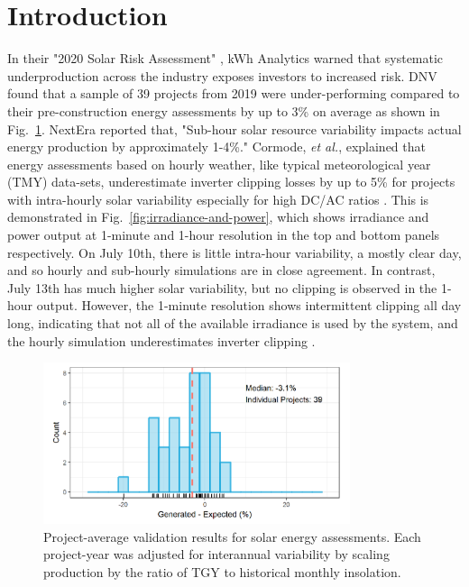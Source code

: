 \documentclass[conference]{IEEEtran}
\begin{document}
\section{Introduction}
In their "2020 Solar Risk Assessment" \cite{Matsui2020}, kWh Analytics warned that systematic underproduction across the industry exposes investors to increased risk. DNV found that a sample of 39 projects from 2019 were under-performing compared to their pre-construction energy assessments by up to 3\% on average as shown in Fig.~\ref{fig:project-underperformance}. NextEra reported that, "Sub-hour solar resource variability impacts actual energy production by approximately 1-4\%." Cormode, \textit{et al.}, explained that energy assessments based on hourly weather, like typical meteorological year (TMY) data-sets, underestimate inverter clipping losses by up to 5\% for projects with intra-hourly solar variability especially for high DC/AC ratios \cite{Cormode2019}. This is demonstrated in Fig.~\ref{fig:irradiance-and-power}, which shows irradiance and power output at 1-minute and 1-hour resolution in the top and bottom panels respectively. On July 10th, there is little intra-hour variability, a mostly clear day, and so hourly and sub-hourly simulations are in close agreement. In contrast, July 13th has much higher solar variability, but no clipping is observed in the 1-hour output. However, the 1-minute resolution shows intermittent clipping all day long, indicating that not all of the available irradiance is used by the system, and the hourly simulation underestimates inverter clipping \cite{Kharait}.

\begin{figure}[htbp]
\centerline{\includegraphics[width=9cm]{fig1.png}}
\caption{Project-average validation results for solar energy assessments. Each project-year was adjusted for interannual variability by scaling production by the ratio of TGY to historical monthly insolation.}
\label{fig:project-underperformance}
\end{figure}
\end{document}
